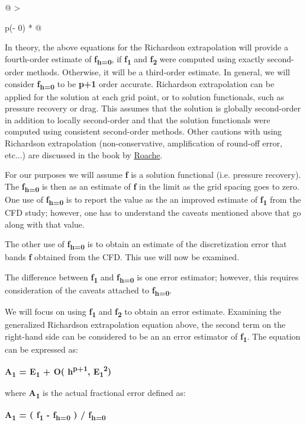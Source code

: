\begin{longtable}[]{@{}
  >{\raggedright\arraybackslash}p{(\columnwidth - 0\tabcolsep) * }@{}}
\begin{minipage}[t]{\linewidth}
In theory, the above equations for the Richardson extrapolation will
provide a fourth-order estimate of \textbf{f\textsubscript{h=0}}, if
\textbf{f\textsubscript{1}} and \textbf{f\textsubscript{2}} were
computed using exactly second-order methods. Otherwise, it will be a
third-order estimate. In general, we will consider
\textbf{f\textsubscript{h=0}} to be \textbf{p+1} order accurate.
Richardson extrapolation can be applied for the solution at each grid
point, or to solution functionals, such as pressure recovery or drag.
This assumes that the solution is globally second-order in addition to
locally second-order and that the solution functionals were computed
using consistent second-order methods. Other cautions with using
Richardson extrapolation (non-conservative, amplification of round-off
error, etc...) are discussed in the book by
\href{https://www.grc.nasa.gov/www/wind/valid/tutorial/bibliog.html\#Roachebook}{Roache}.

For our purposes we will assume \textbf{f} is a solution functional
(i.e. pressure recovery). The \textbf{f\textsubscript{h=0}} is then as
an estimate of \textbf{f} in the limit as the grid spacing goes to zero.
One use of \textbf{f\textsubscript{h=0}} is to report the value as the
an improved estimate of \textbf{f\textsubscript{1}} from the CFD study;
however, one has to understand the caveats mentioned above that go along
with that value.

The other use of \textbf{f\textsubscript{h=0}} is to obtain an estimate
of the discretization error that bands \textbf{f} obtained from the CFD.
This use will now be examined.

The difference between \textbf{f\textsubscript{1}} and
\textbf{f\textsubscript{h=0}} is one error estimator; however, this
requires consideration of the caveats attached to
\textbf{f\textsubscript{h=0}}.

We will focus on using \textbf{f\textsubscript{1}} and
\textbf{f\textsubscript{2}} to obtain an error estimate. Examining the
generalized Richardson extrapolation equation above, the second term on
the right-hand side can be considered to be an an error estimator of
\textbf{f\textsubscript{1}}. The equation can be expressed as:

\textbf{A\textsubscript{1} = E\textsubscript{1} + O(
h\textsuperscript{p+1}, E\textsubscript{1}\textsuperscript{2})}

where \textbf{A\textsubscript{1}} is the actual fractional error defined
as:

\textbf{A\textsubscript{1} = ( f\textsubscript{1} - f\textsubscript{h=0}
) / f\textsubscript{h=0}}


\end{minipage}
\end{longtable}
